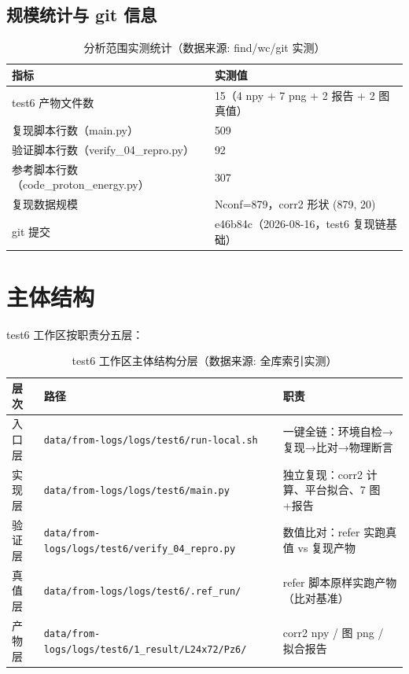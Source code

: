 \documentclass[UTF8]{ctexart}
\begin{document}
\subsection{规模统计与 git 信息}
\begin{table}[htbp]\centering
\begin{tabular}{ll}
\toprule
指标 & 实测值 \\
\midrule
test6 产物文件数 & 15（4 npy + 7 png + 2 报告 + 2 图真值） \\
复现脚本行数（main.py） & 509 \\
验证脚本行数（verify\_04\_repro.py） & 92 \\
参考脚本行数（code\_proton\_energy.py） & 307 \\
复现数据规模 & Nconf=879，corr2 形状 (879, 20) \\
git 提交 & e46b84c（2026-08-16，test6 复现链基础） \\
\bottomrule
\end{tabular}
\caption{分析范围实测统计（数据来源: find/wc/git 实测）}
\end{table}

\section{主体结构}
test6 工作区按职责分五层：
\begin{table}[htbp]\centering
\begin{tabularx}{\textwidth}{llX}
\toprule
\textcolor{struct}{层次} & 路径 & \textcolor{struct}{职责} \\
\midrule
入口层 & \texttt{data/from-logs/logs/test6/run-local.sh} & 一键全链：环境自检→复现→比对→物理断言 \\
实现层 & \texttt{data/from-logs/logs/test6/main.py} & 独立复现：corr2 计算、平台拟合、7 图+报告 \\
验证层 & \texttt{data/from-logs/logs/test6/verify\_04\_repro.py} & 数值比对：refer 实跑真值 vs 复现产物 \\
真值层 & \texttt{data/from-logs/logs/test6/.ref\_run/} & refer 脚本原样实跑产物（比对基准） \\
产物层 & \texttt{data/from-logs/logs/test6/1\_result/L24x72/Pz6/} & corr2 npy / 图 png / 拟合报告 \\
\bottomrule
\end{tabularx}
\caption{test6 工作区主体结构分层（数据来源: 全库索引实测）}
\end{table}
\end{document}
